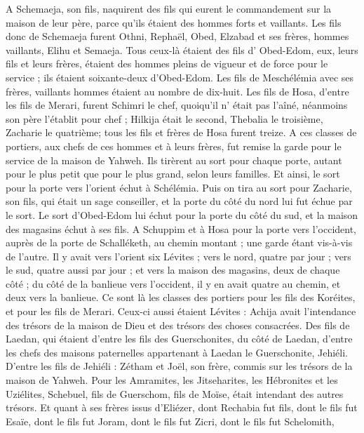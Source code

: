 \begin{multicols}{2}
A Schemaeja, son fils, naquirent des fils qui eurent le commandement sur la maison de leur père, parce qu'ils étaient des hommes forts et vaillants.
Les fils donc de Schemaeja furent Othni, Rephaël, Obed, Elzabad et ses frères, hommes vaillants, Elihu et Semaeja.
Tous ceux-là étaient des fils d' Obed-Edom, eux, leurs fils et leurs frères, étaient des hommes pleins de vigueur et de force pour le service ; ils étaient soixante-deux d'Obed-Edom.
Les fils de Meschélémia avec ses frères, vaillants hommes étaient au nombre de dix-huit.
Les fils de Hosa, d'entre les fils de Merari, furent  Schimri le chef, quoiqu'il n’ était pas l'aîné, néanmoins son père l'établit pour chef ;
Hilkija était le second, Thebalia le troisième, Zacharie le quatrième; tous les fils et frères de Hosa furent treize.
A ces classes de portiers, aux chefs de ces hommes et à leurs frères, fut remise la garde pour le service de la maison de Yahweh.
Ils tirèrent au sort pour chaque porte, autant pour le plus petit que pour le plus grand, selon leurs familles.
Et ainsi, le sort pour la porte vers l'orient échut à Schélémia. Puis on tira au sort pour Zacharie, son fils, qui était un sage conseiller, et la porte du côté du nord lui fut échue par le sort.
Le sort d'Obed-Edom lui échut pour la porte du côté du sud, et la maison des magasins échut à ses fils.
A Schuppim et à Hosa pour la porte vers l'occident, auprès de la porte de Schalléketh, au chemin montant ; une garde étant vis-à-vis de l'autre.
Il y avait vers l'orient six Lévites ; vers le nord, quatre par jour  ; vers le sud, quatre aussi par jour ; et vers la maison des magasins, deux de chaque côté ;
du côté de la banlieue vers l'occident, il y en avait quatre au chemin, et deux vers la banlieue.
Ce sont là les classes des portiers pour les fils des Koréites, et pour les fils de Merari.
Ceux-ci aussi étaient Lévites : Achija avait l’intendance des trésors de la maison de Dieu et des trésors des choses consacrées.
Des fils de Laedan, qui étaient d'entre les fils des Guerschonites, du côté de Laedan, d'entre les chefs des maisons paternelles appartenant à Laedan le Guerschonite, Jehiéli.
D'entre les fils de Jehiéli : Zétham et Joël, son frère, commis sur les trésors de la maison de Yahweh.
Pour les Amramites, les Jitseharites, les Hébronites et les  Uziélites,
Schebuel, fils de Guerschom, fils de Moïse, était intendant des autres trésors.
Et quant à ses frères issus d'Eliézer, dont Rechabia fut fils, dont le fils fut Esaïe, dont le fils fut Joram, dont le fils fut  Zicri, dont le fils fut Schelomith,

\end{multicols}
